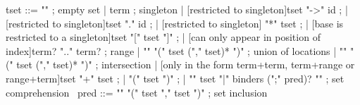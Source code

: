 \begin{syntax}
  tset ::= "\empty" ; empty set
       | term ; singleton
       | {[restricted to singleton]tset "->" id} ;
       | {[restricted to singleton]tset "." id} ;
       | {[restricted to singleton] "*" tset} ;
       | {[base is restricted to a singleton]tset "[" tset "]"} ;
       | {[can only appear in position of index]term? ".." term?} ; range
       | "\union" "(" tset ("," tset)* ")" ; union of locations
       | "\inter" "(" tset ("," tset)* ")" ; intersection
       | {[only in the form term+term, term+range or range+term]tset "+" tset} ;
       | "(" tset ")" ;
       | "{" tset "|" binders (";" pred)? "}" ; set comprehension
       \
  pred ::= {"\subset" "(" tset "," tset ")"} ; set inclusion
\end{syntax}

